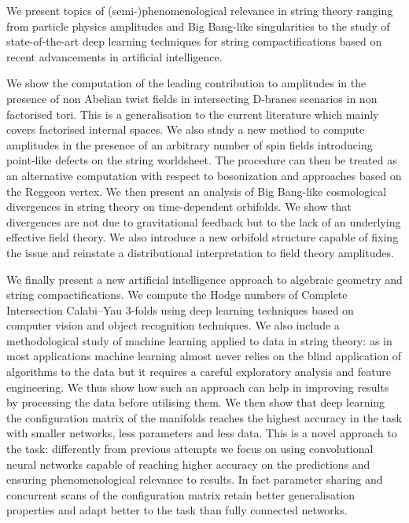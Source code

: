 We present topics of (semi-)phenomenological relevance in string theory ranging from particle physics amplitudes and Big Bang-like singularities to the study of state-of-the-art deep learning techniques for string compactifications based on recent advancements in artificial intelligence.

We show the computation of the leading contribution to amplitudes in the presence of non Abelian twist fields in intersecting D-branes scenarios in non factorised tori.
This is a generalisation to the current literature which mainly covers factorised internal spaces.
We also study a new method to compute amplitudes in the presence of an arbitrary number of spin fields introducing point-like defects on the string worldsheet.
The procedure can then be treated as an alternative computation with respect to bosonization and approaches based on the Reggeon vertex.
We then present an analysis of Big Bang-like cosmological divergences in string theory on time-dependent orbifolds.
We show that divergences are not due to gravitational feedback but to the lack of an underlying effective field theory.
We also introduce a new orbifold structure capable of fixing the issue and reinstate a distributional interpretation to field theory amplitudes.

We finally present a new artificial intelligence approach to algebraic geometry and string compactifications.
We compute the Hodge numbers of Complete Intersection Calabi--Yau $3$-folds using deep learning techniques based on computer vision and object recognition techniques.
We also include a methodological study of machine learning applied to data in string theory: as in most applications machine learning almost never relies on the blind application of algorithms to the data but it requires a careful exploratory analysis and feature engineering.
We thus show how such an approach can help in improving results by processing the data before utilising them.
We then show that deep learning the configuration matrix of the manifolds reaches the highest accuracy in the task with smaller networks, less parameters and less data.
This is a novel approach to the task: differently from previous attempts we focus on using convolutional neural networks capable of reaching higher accuracy on the predictions and ensuring phenomenological relevance to results.
In fact parameter sharing and concurrent scans of the configuration matrix retain better generalisation properties and adapt better to the task than fully connected networks.


